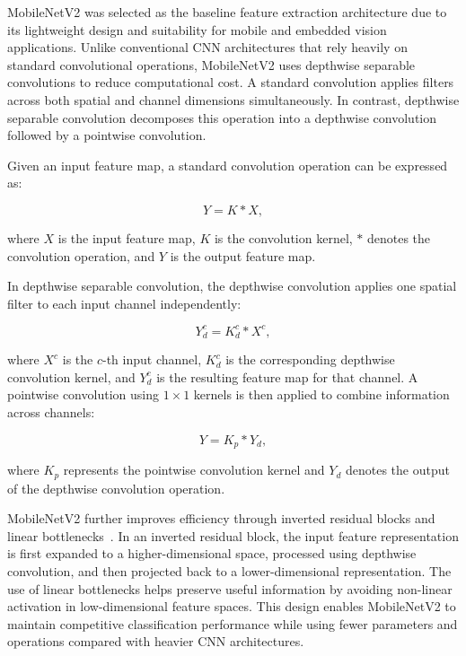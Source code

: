 MobileNetV2 was selected as the baseline feature extraction architecture due to its lightweight design and suitability for mobile and embedded vision applications. Unlike conventional CNN architectures that rely heavily on standard convolutional operations, MobileNetV2 uses depthwise separable convolutions to reduce computational cost. A standard convolution applies filters across both spatial and channel dimensions simultaneously. In contrast, depthwise separable convolution decomposes this operation into a depthwise convolution followed by a pointwise convolution.

Given an input feature map, a standard convolution operation can be expressed as:

\begin{equation}
    Y = K * X,
\end{equation}

where $X$ is the input feature map, $K$ is the convolution kernel, $*$ denotes the convolution operation, and $Y$ is the output feature map.

In depthwise separable convolution, the depthwise convolution applies one spatial filter to each input channel independently:

\begin{equation}
    Y_{d}^{c} = K_{d}^{c} * X^{c},
\end{equation}

where $X^{c}$ is the $c$-th input channel, $K_{d}^{c}$ is the corresponding depthwise convolution kernel, and $Y_{d}^{c}$ is the resulting feature map for that channel. A pointwise convolution using $1 \times 1$ kernels is then applied to combine information across channels:

\begin{equation}
    Y = K_{p} * Y_{d},
\end{equation}

where $K_{p}$ represents the pointwise convolution kernel and $Y_{d}$ denotes the output of the depthwise convolution operation.

MobileNetV2 further improves efficiency through inverted residual blocks and linear bottlenecks~\cite{sandler2018mobilenetv2}. In an inverted residual block, the input feature representation is first expanded to a higher-dimensional space, processed using depthwise convolution, and then projected back to a lower-dimensional representation. The use of linear bottlenecks helps preserve useful information by avoiding non-linear activation in low-dimensional feature spaces. This design enables MobileNetV2 to maintain competitive classification performance while using fewer parameters and operations compared with heavier CNN architectures.

